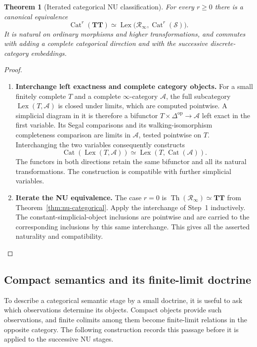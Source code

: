 \documentclass[oneside]{article}
\theoremstyle{plain}
\newtheorem{theorem}{Theorem}[section]
\theoremstyle{definition}
\theoremstyle{remark}
\newcommand{\Lex}{\operatorname{Lex}}
\newcommand{\RNU}{\mathcal R_{\infty}}
\newcommand{\Sps}{\mathcal S}
\newcommand{\TT}{\mathbf{TT}}
\newcommand{\Th}{\operatorname{Th}}
\newcommand{\op}{\mathrm{op}}
\begin{document}
\begin{theorem}[Iterated categorical NU classification]
\label{thm:stratified-NU-semantics}
For every $r\geq0$ there is a canonical equivalence
\begin{equation}\label{eq:stratified-NU-semantics}
 \operatorname{Cat}^r(\TT)
 \simeq
 \Lex\bigl(\RNU,\operatorname{Cat}^r(\Sps)\bigr).
\end{equation}
It is natural on ordinary morphisms and higher transformations, and
commutes with adding a complete categorical direction and with the
successive discrete-category embeddings.
\end{theorem}
\begin{proof}
\leavevmode
\begin{enumerate}
\item \textbf{Interchange left exactness and complete category objects.}
For a small finitely complete $T$ and a complete $\infty$-category
$\mathcal A$, the full subcategory $\Lex(T,\mathcal A)$ is closed
under limits, which are computed pointwise.  A simplicial diagram
in it is therefore a bifunctor $T\times\Delta^{\op}\to\mathcal A$
left exact in the first variable.  Its Segal comparisons and its
walking-isomorphism completeness comparison are limits in
$\mathcal A$, tested pointwise on $T$.  Interchanging the two
variables consequently constructs
\[
 \operatorname{Cat}(\Lex(T,\mathcal A))
 \simeq\Lex(T,\operatorname{Cat}(\mathcal A)).
\]
The functors in both directions retain the same bifunctor and all its
natural transformations.  The construction is compatible with further
simplicial variables.
\item \textbf{Iterate the NU equivalence.}
The case $r=0$ is
$\Th(\RNU)\simeq\TT$ from
Theorem~\ref{thm:nu-categorical}.  Apply the interchange of Step~1
inductively.  The constant-simplicial-object inclusions are pointwise
and are carried to the corresponding inclusions by this same
interchange.  This gives all the asserted naturality and compatibility.
\qedhere
\end{enumerate}
\end{proof}

\subsection{Compact semantics and its finite-limit doctrine}
\label{subsec:compact-semantic-syntax}

To describe a categorical semantic stage by a small doctrine, it is useful
to ask which observations determine its objects. Compact objects provide
such observations, and finite colimits among them become finite-limit
relations in the opposite category. The following construction records
this passage before it is applied to the successive NU stages.
\end{document}
